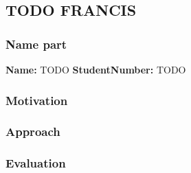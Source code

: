 \subsection{TODO FRANCIS}
\subsubsection*{Name part}
\textbf{Name:} TODO \indent \textbf{StudentNumber:} TODO

\subsubsection*{Motivation}

\subsubsection*{Approach}

\subsubsection*{Evaluation }